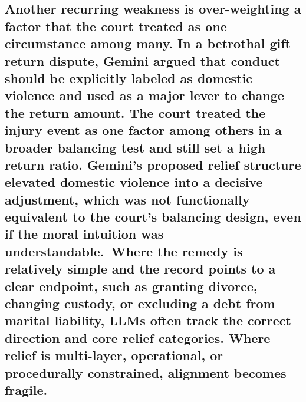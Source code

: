 {\subsection{\texorpdfstring{Another recurring weakness is over-weighting a factor that the court treated as one circumstance among many. In a betrothal gift return dispute, Gemini argued that conduct should be explicitly labeled as domestic violence and used as a major lever to change the return amount. The court treated the injury event as one factor among others in a broader balancing test and still set a high return ratio. Gemini's proposed relief structure elevated domestic violence into a decisive adjustment, which was not functionally equivalent to the court's balancing design, even if the moral intuition was understandable.~Where the remedy is relatively simple and the record points to a clear endpoint, such as granting divorce, changing custody, or excluding a debt from marital liability, LLMs often track the correct direction and core relief categories. Where relief is multi-layer, operational, or procedurally constrained, alignment becomes fragile. }{Another recurring weakness is over-weighting a factor that the court treated as one circumstance among many. In a betrothal gift return dispute, Gemini argued that conduct should be explicitly labeled as domestic violence and used as a major lever to change the return amount. The court treated the injury event as one factor among others in a broader balancing test and still set a high return ratio. Gemini's proposed relief structure elevated domestic violence into a decisive adjustment, which was not functionally equivalent to the court's balancing design, even if the moral intuition was understandable.~Where the remedy is relatively simple and the record points to a clear endpoint, such as granting divorce, changing custody, or excluding a debt from marital liability, LLMs often track the correct direction and core relief categories. Where relief is multi-layer, operational, or procedurally constrained, alignment becomes fragile. }}\label{another-recurring-weakness-is-over-weighting-a-factor-that-the-court-treated-as-one-circumstance-among-many.-in-a-betrothal-gift-return-dispute-gemini-argued-that-conduct-should-be-explicitly-labeled-as-domestic-violence-and-used-as-a-major-lever-to-change-the-return-amount.-the-court-treated-the-injury-event-as-one-factor-among-others-in-a-broader-balancing-test-and-still-set-a-high-return-ratio.-geminis-proposed-relief-structure-elevated-domestic-violence-into-a-decisive-adjustment-which-was-not-functionally-equivalent-to-the-courts-balancing-design-even-if-the-moral-intuition-was-understandable.-where-the-remedy-is-relatively-simple-and-the-record-points-to-a-clear-endpoint-such-as-granting-divorce-changing-custody-or-excluding-a-debt-from-marital-liability-llms-often-track-the-correct-direction-and-core-relief-categories.-where-relief-is-multi-layer-operational-or-procedurally-constrained-alignment-becomes-fragile.}}

